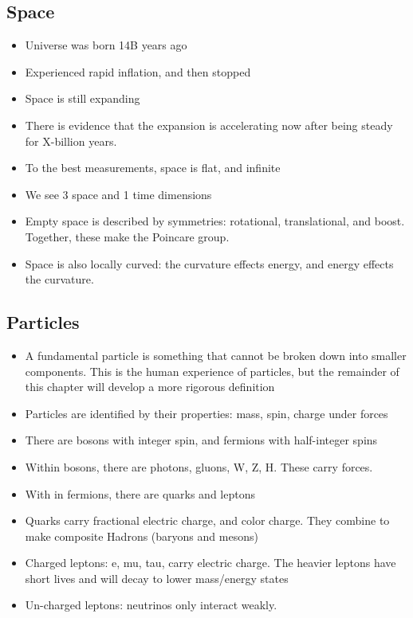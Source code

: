 \subsection{Space}
\begin{itemize}
    \item Universe was born 14B years ago
    \item Experienced rapid inflation, and then stopped
    \item Space is still expanding
    \item There is evidence that the expansion is accelerating now after being steady for X-billion years.
    \item To the best measurements, space is flat, and infinite
    \item We see 3 space and 1 time dimensions
    \item Empty space is described by symmetries: rotational, translational, and boost. Together, these make the Poincare group.
    \item Space is also locally curved: the curvature effects energy, and energy effects the curvature.
\end{itemize}

\subsection{Particles}
\begin{itemize}
    \item A fundamental particle is something that cannot be broken down into smaller components. This is the human experience of particles, but the remainder of this chapter will develop a more rigorous definition
    \item Particles are identified by their properties: mass, spin, charge under forces
    \item There are bosons with integer spin, and fermions with half-integer spins
    \item Within bosons, there are photons, gluons, W, Z, H. These carry forces.
    \item With in fermions, there are quarks and leptons
    \item Quarks carry fractional electric charge, and color charge. They combine to make composite Hadrons (baryons and mesons)
    \item Charged leptons: e, mu, tau, carry electric charge. The heavier leptons have short lives and will decay to lower mass/energy states
    \item Un-charged leptons: neutrinos only interact weakly.
\end{itemize}


